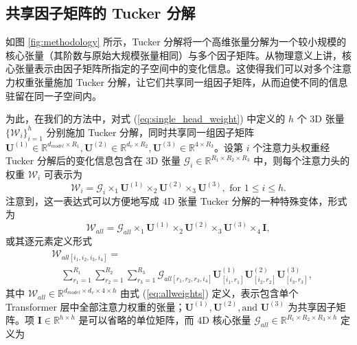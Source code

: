 \subsection{共享因子矩阵的 Tucker 分解}
如图 \ref{fig:methodology} 所示，Tucker 分解将一个高维张量分解为一个较小规模的核心张量（其阶数与原始大规模张量相同）与多个因子矩阵。从物理意义上讲，核心张量表示由因子矩阵所指定的子空间中的变化信息。这使得我们可以对多个注意力权重张量施加 Tucker 分解，让它们共享同一组因子矩阵，从而迫使不同的信息驻留在同一子空间内。

为此，在我们的方法中，对式 (\ref{eq:single_head_weight}) 中定义的 $h$ 个 3D 张量 $\{\mathcal{W}_i \}_{i=1}^h$ 分别施加 Tucker 分解，同时共享同一组因子矩阵 $\mathbf{U}^{(1)} \in \mathbb{R}^{d_{model} \times R_1}, \mathbf{U}^{(2)} \in \mathbb{R}^{d_{v} \times R_2}, \mathbf{U}^{(3)} \in \mathbb{R}^{4 \times R_3}$。设第 $i$ 个注意力头权重经 Tucker 分解后的变化信息包含在 3D 张量 $\mathcal{G}_i \in \mathbb{R}^{R_1 \times R_2 \times R_3}$ 中，则每个注意力头的权重 $\mathcal{W}_i$ 可表示为
\begin{equation}
    \mathcal{W}_i = \mathcal{G}_i \times_1 \mathbf{U}^{(1)} \times_2 \mathbf{U}^{(2)} \times_3 \mathbf{U}^{(3)}, \text{ for } 1\leq i \leq h.
\label{eq:tucker_with_shared_factors_1}
\end{equation}
注意到，这一表达式可以方便地写成 4D 张量 Tucker 分解的一种特殊变体，形式为
\begin{equation}
    \mathcal{W}_{all} = \mathcal{G}_{all} \times_1 \mathbf{U}^{(1)} \times_2 \mathbf{U}^{(2)} \times_3 \mathbf{U}^{(3)} \times_4 \mathbf{I},
\label{eq:tucker_with_shared_factors}
\end{equation}
或其逐元素定义形式
\begin{equation}
\begin{split}
&\mathcal{W}_{all[i_1, i_2, i_3, i_4]} =  \\
&\quad \sum_{r_1=1}^{R_1} \sum_{r_2=1}^{R_2} \sum_{r_3=1}^{R_3} \mathcal{G}_{all [r_1, r_2, r_3, i_4]} \mathbf{U}^{(1)}_{[i_1, r_1]} \mathbf{U}^{(2)}_{[i_2, r_2]} \mathbf{U}^{(3)}_{[i_3, r_3]},
\end{split}
\label{eq:tucker_with_shared_factors_index_notation}
\end{equation}
其中 $\mathcal{W}_{all} \in \mathbb{R}^{d_{model} \times d_v \times 4 \times h}$ 由式 (\ref{eq:allweights}) 定义，表示包含单个 Transformer 层中全部注意力权重的张量；$\mathbf{U}^{(1)}, \mathbf{U}^{(2)}, \text{and } \mathbf{U}^{(3)}$ 为共享因子矩阵。项 $\mathbf{I} \in \mathbb{R}^{h\times h}$ 是可以省略的单位矩阵，而 4D 核心张量 $\mathcal{G}_{all} \in \mathbb{R}^{R_1 \times R_2 \times R_3 \times h}$ 定义为
